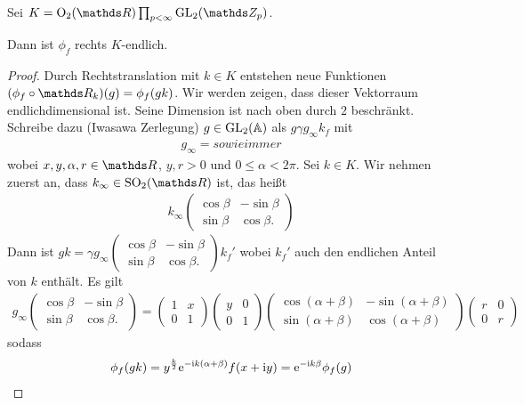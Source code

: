 Sei $K=\Oo_2(\R) \prod_{p<\infty} \GL_2(\Z_p)$.
\begin{prop}
Dann ist $\phi_f$ rechts $K$-endlich. 
\end{prop}
\begin{proof}
Durch Rechtstranslation mit $k\in K$ entstehen neue Funktionen $(\phi_f \circ \R_k)(g)=\phi_f(gk)$.
Wir werden zeigen, dass dieser Vektorraum endlichdimensional ist.
Seine Dimension ist nach oben durch $2$ beschränkt.
Schreibe dazu (Iwasawa Zerlegung) $g\in \operatorname{GL}_2(\mathbb{A})$ als $g \gamma g_\infty k_f$ mit
\begin{align*}
g_\infty= sowie immer
\end{align*}
wobei $x,y,\alpha,r \in \R$, $y,r>0$ und $0\leq \alpha < 2\pi$. Sei $k\in K$.
Wir nehmen zuerst an, dass $k_\infty \in \SO_2(\R)$ ist, das heißt
\begin{align*}
k_\infty \begin{pmatrix}
\cos \beta &-\sin \beta\\
\sin \beta &\cos \beta.
\end{pmatrix}
\end{align*}
Dann ist $gk=\gamma g_\infty \begin{pmatrix}
\cos \beta &-\sin \beta\\
\sin \beta &\cos \beta.
\end{pmatrix} k_f'$ wobei $k_f'$ auch den endlichen Anteil von $k$ enthält.
Es gilt
\begin{align*}
g_\infty \begin{pmatrix}
\cos \beta &-\sin \beta\\
\sin \beta &\cos \beta.
\end{pmatrix}= \begin{pmatrix}
1 &x\\
0 &1
\end{pmatrix}
\begin{pmatrix}
y &0\\
0 &1
\end{pmatrix}
\begin{pmatrix}
\cos(\alpha+\beta) &-\sin(\alpha+\beta)\\
\sin(\alpha+\beta) &\cos(\alpha+\beta)
\end{pmatrix}
\begin{pmatrix}
r &0\\
0 &r
\end{pmatrix}
\end{align*}
sodass
\begin{align*}
\phi_f(gk)= y^{\frac{k}{2}} \ex^{-\mathrm{i}k(\alpha+\beta)} f(x+\mathrm{i}y)=\mathrm{e}^{-\mathrm{i}k\beta}  \phi_f(g)

\end{align*}
\end{proof}

